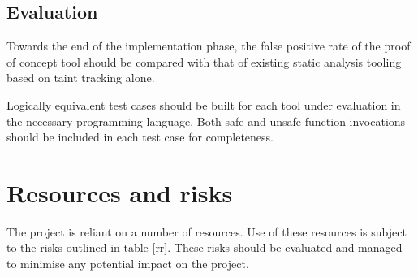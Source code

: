 \documentclass[a4paper,openany,12pt]{book}
\begin{document}
\subsection*{Evaluation}

Towards the end of the implementation phase, the false positive rate of the proof of concept tool should be compared with that of existing static analysis tooling based on taint tracking alone.

Logically equivalent test cases should be built for each tool under evaluation in the necessary programming language. Both safe and unsafe function invocations should be included in each test case for completeness.

\section*{Resources and risks}


The project is reliant on a number of resources. Use of these resources is subject to the risks outlined in table \ref{rr}. These risks should be evaluated and managed to minimise any potential impact on the project.
\end{document}
